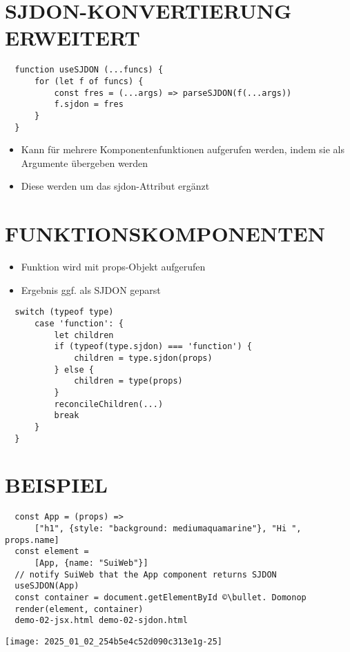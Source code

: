   \section*{SJDON-KONVERTIERUNG ERWEITERT}
  \begin{verbatim}
  function useSJDON (...funcs) {
      for (let f of funcs) {
          const fres = (...args) => parseSJDON(f(...args))
          f.sjdon = fres
      }
  }
  \end{verbatim}
  
  \begin{itemize}
    \item Kann für mehrere Komponentenfunktionen aufgerufen werden, indem sie als Argumente übergeben werden
    \item Diese werden um das sjdon-Attribut ergänzt
  \end{itemize}
  
  \section*{FUNKTIONSKOMPONENTEN}
  \begin{itemize}
    \item Funktion wird mit props-Objekt aufgerufen
    \item Ergebnis ggf. als SJDON geparst
  \end{itemize}
  
  \begin{verbatim}
  switch (typeof type)
      case 'function': {
          let children
          if (typeof(type.sjdon) === 'function') {
              children = type.sjdon(props)
          } else {
              children = type(props)
          }
          reconcileChildren(...)
          break
      }
  }
  \end{verbatim}
  
  \section*{BEISPIEL}
  \begin{verbatim}
  const App = (props) =>
      ["h1", {style: "background: mediumaquamarine"}, "Hi ", props.name]
  const element =
      [App, {name: "SuiWeb"}]
  // notify SuiWeb that the App component returns SJDON
  useSJDON(App)
  const container = document.getElementById ©\bullet. Domonop
  render(element, container)
  demo-02-jsx.html demo-02-sjdon.html
  \end{verbatim}
  
  \begin{center}
  \texttt{[image: 2025\_01\_02\_254b5e4c52d090c313e1g-25]}
  \end{center}
  
